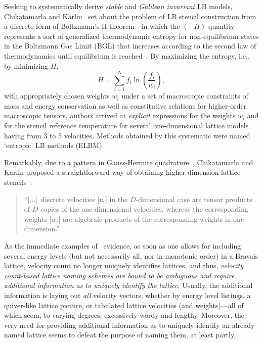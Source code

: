     Seeking  to  systematically   derive   \emph{stable}   and   \emph{Galilean   invariant}   LB   models,   Chikatamarla   and
    Karlin~\cite{2006-ChikatamarlaSS+KarlinIV-PhysRevLett} set about the problem of LB stencil construction from a discrete form
    of Boltzmann's H-theorem---in which the  $(-H)$  quantity  represents  a  sort  of  generalized  thermodynamic  entropy  for
    non-equilibrium states in the Boltzmann Gas Limit (BGL) that increases according to the second law of  thermodynamics  until
    equilibrium is reached~\cite{2011-HarrisS-Dover}. By maximizing the entropy, i.e., by minimizing $H$,
    \begin{equation}
        H = \sum_{i=1}^{N}f_i\ln\left(\frac{f_i}{w_i}\right),
    \end{equation}
    \noindent with appropriately chosen weights $w_i$ under a set of macroscopic constraints of mass and energy conservation  as
    well as constitutive relations for higher-order macroscopic tensors, authors arrived at \emph{explicit} expressions for  the
    weights $w_i$ and for the stencil reference temperature for several one-dimensional  lattice  models  having  from  3  to  5
    velocities. Methods obtained by this systematic were named `entropic' LB methods (ELBM).

    Remarkably, due to a pattern in Gauss-Hermite  quadrature~\cite{2003-AnsumaliS+OettingerHC-EuroPhysLett},  Chikatamarla  and
    Karlin       proposed       a       straightforward       way       of       obtaining       higher-dimension        lattice
    stencils~\cite{2006-ChikatamarlaSS+KarlinIV-PhysRevLett}:

    \begin{quote}
        \swshape
        ``[...]~discrete velocities [$\mathbf{c}_i$] in the $D$-dimensional case are  tensor  products  of  $D$  copies  of  the
        one-dimensional velocities, whereas the corresponding weights  [$w_i$]  are  algebraic  products  of  the  corresponding
        weights in one dimension.''
    \end{quote}

    As the immediate examples of~\cite{2006-PhilippiPC+SurmasR-PhysRevE} evidence, as soon as one allows for  including  several
    energy levels (but not necessarily all, nor in monotonic order) in a Bravais lattice,  velocity  count  no  longer  uniquely
    identifies lattices, and thus, \emph{velocity count-based lattice naming schemes are  bound  to  be  ambiguous  and  require
    additional information as to uniquely identify the lattice.\/} Usually, the additional information is laying out  \emph{all}
    velocity vectors, whether by energy level listings, a quiver-like lattice picture,  or  tabulated  lattice  velocities  (and
    weights)---all of which seem, to varying degrees, excessively wordy and lengthy.  Moreover,  the  very  need  for  providing
    additional information as to uniquely identify an already named lattice seems to defeat the purpose of naming them, at least
    partly.

